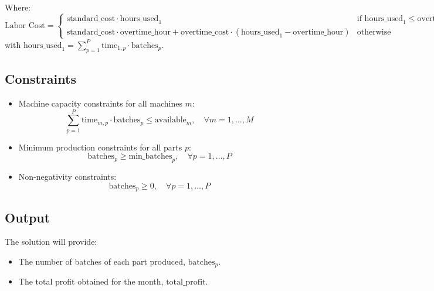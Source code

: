 \documentclass{article}
\begin{document}
Where:
\[
\text{Labor Cost} = \begin{cases}
    \text{standard\_cost} \cdot \text{hours\_used}_{1} & \text{if } \text{hours\_used}_{1} \leq \text{overtime\_hour} \\
    \text{standard\_cost} \cdot \text{overtime\_hour} + \text{overtime\_cost} \cdot (\text{hours\_used}_{1} - \text{overtime\_hour}) & \text{otherwise}
\end{cases}
\]
with \( \text{hours\_used}_{1} = \sum_{p=1}^{P} \text{time}_{1,p} \cdot \text{batches}_{p} \).

\subsection*{Constraints}
\begin{itemize}
    \item Machine capacity constraints for all machines \( m \):
    \[
    \sum_{p=1}^{P} \text{time}_{m,p} \cdot \text{batches}_{p} \leq \text{available}_{m}, \quad \forall m = 1, \ldots, M
    \]
    
    \item Minimum production constraints for all parts \( p \):
    \[
    \text{batches}_{p} \geq \text{min\_batches}_{p}, \quad \forall p = 1, \ldots, P
    \]
    
    \item Non-negativity constraints:
    \[
    \text{batches}_{p} \geq 0, \quad \forall p = 1, \ldots, P
    \]
\end{itemize}

\subsection*{Output}
The solution will provide:
\begin{itemize}
    \item The number of batches of each part produced, \( \text{batches}_{p} \).
    \item The total profit obtained for the month, \( \text{total\_profit} \).
\end{itemize}
\end{document}
